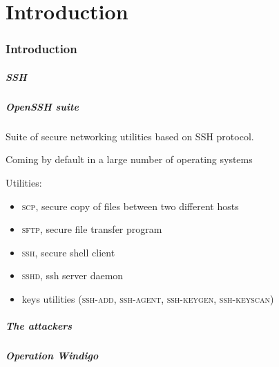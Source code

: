 \part{Introduction}
\section{Introduction}

\begin{frame}
	\partpage
\end{frame}

\begin{frame}
	\frametitle{SSH}
	
	
\end{frame}


\begin{frame}
	\frametitle{OpenSSH suite}
		
	Suite of secure networking utilities based on SSH protocol.
	
	\medskip
	
	Coming by default in a large number of operating systems
	
	\medskip
		
	Utilities:
	
	\begin{itemize}
	  \item \textsc{scp}, secure copy of files between two different hosts
	  \item \textsc{sftp}, secure file transfer program
	  \item \textsc{ssh}, secure shell client
	  \item \textsc{sshd}, ssh server daemon
	  \item keys utilities (\textsc{ssh-add}, \textsc{ssh-agent}, \textsc{ssh-keygen}, \textsc{ssh-keyscan})
	\end{itemize}

\end{frame}


\begin{frame}
	\frametitle{The attackers}
\end{frame}


\begin{frame}
	\frametitle{Operation Windigo}
\end{frame}
